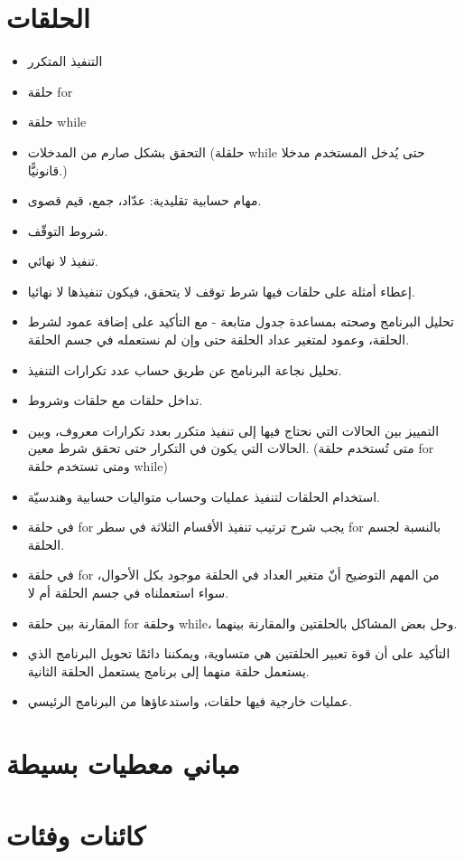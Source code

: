 ﻿\documentclass[14pt]{extarticle}
\begin{document}
\section{الحلقات}
\begin{itemize}
    \item التنفيذ المتكرر
    \item حلقة \textenglish{for}
    \item حلقة \textenglish{while}
    \item التحقق بشكل صارم من المدخلات (حلقلة \textenglish{while} حتى يُدخل المستخدم مدخلا قانونيًّا.)
    \item مهام حسابية تقليدية: عدّاد، جمع، قيم قصوى.
    \item شروط التوقّف.
    \item تنفيذ لا نهائي.
    \item إعطاء أمثلة على حلقات فيها شرط توقف لا يتحقق، فيكون تنفيذها لا نهائيا.
    \item تحليل البرنامج وصحته بمساعدة جدول متابعة - مع التأكيد على إضافة عمود لشرط الحلقة، وعمود لمتغير عداد الحلقة حتى وإن لم نستعمله في جسم الحلقة.
    \item تحليل نجاعة البرنامج عن طريق حساب عدد تكرارات التنفيذ.
    \item تداخل حلقات مع حلقات وشروط.
    \item التمييز بين الحالات التي نحتاج فيها إلى تنفيذ متكرر بعدد تكرارات معروف، وبين الحالات التي يكون في التكرار حتى
    تحقق شرط معين. (متى تُستخدم حلقة \textenglish{for} ومتى تستخدم حلقة \textenglish{while})
    \item استخدام الحلقات لتنفيذ عمليات وحساب متواليات حسابية وهندسيّة.
    \item في حلقة \textenglish{for} يجب شرح ترتيب تنفيذ الأقسام الثلاثة في سطر \textenglish{for} بالنسبة لجسم الحلقة.
    \item في حلقة \textenglish{for} من المهم التوضيح أنّ متغير العداد في الحلقة موجود بكل الأحوال، سواء استعملناه في جسم الحلقة أم لا.
    \item المقارنة بين حلقة \textenglish{for} وحلقة \textenglish{while}، وحل بعض المشاكل بالحلقتين والمقارنة بينهما.
    \item التأكيد على أن قوة تعبير الحلقتين هي متساوية، ويمكننا دائمًا تحويل البرنامج الذي يستعمل حلقة منهما إلى برنامج يستعمل الحلقة الثانية.
    \item عمليات خارجية فيها حلقات، واستدعاؤها من البرنامج الرئيسي.
\end{itemize}


\clearpage
\section{مباني معطيات بسيطة}

\clearpage
\section{كائنات وفئات}
\end{document}
